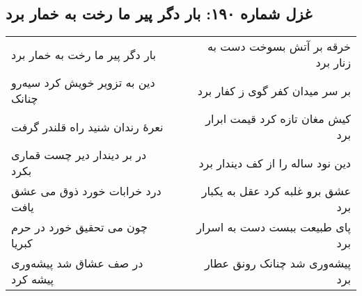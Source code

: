 \begin{center}
\section*{غزل شماره ۱۹۰: بار دگر پیر ما رخت به خمار برد}
\label{sec:190}
\begin{longtable}{l p{0.5cm} r}
بار دگر پیر ما رخت به خمار برد
&&
خرقه بر آتش بسوخت دست به زنار برد
\\
دین به تزویر خویش کرد سیه‌رو چنانک
&&
بر سر میدان کفر گوی ز کفار برد
\\
نعرهٔ رندان شنید راه قلندر گرفت
&&
کیش مغان تازه کرد قیمت ابرار برد
\\
در بر دیندار دیر چست قماری بکرد
&&
دین نود ساله را از کف دیندار برد
\\
درد خرابات خورد ذوق می عشق یافت
&&
عشق برو غلبه کرد عقل به یکبار برد
\\
چون می تحقیق خورد در حرم کبریا
&&
پای طبیعت ببست دست به اسرار برد
\\
در صف عشاق شد پیشه‌وری پیشه کرد
&&
پیشه‌وری شد چنانک رونق عطار برد
\\
\end{longtable}
\end{center}
